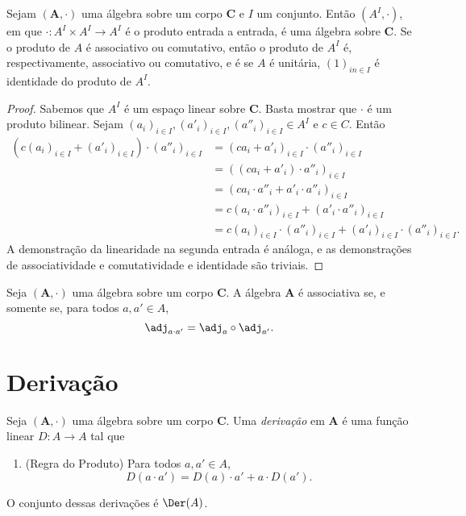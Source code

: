\begin{prop}
Sejam $(\bm A,\cdot)$ uma álgebra sobre um corpo $\bm C$ e $I$ um conjunto. Então $(A^I,\cdot)$, em que $\cdot\colon A^I \times A^I \to A^I$ é o produto entrada a entrada, é uma álgebra sobre $\bm C$. Se o produto de $A$ é associativo ou comutativo, então o produto de $A^I$ é, respectivamente, associativo ou comutativo, e é se $A$ é unitária, $(1)_{in \in I}$ é identidade do produto de $A^I$.
\end{prop}
\begin{proof}
Sabemos que $A^I$ é um espaço linear sobre $\bm C$. Basta mostrar que $\cdot$ é um produto bilinear. Sejam $(a_i)_{i \in I},(a'_i)_{i \in I},(a''_i)_{i \in I} \in A^I$ e $c \in C$. Então
	\begin{align*}
	(c(a_i)_{i \in I} + (a'_i)_{i \in I}) \cdot (a''_i)_{i \in I} &= (ca_i + a'_i)_{i \in I} \cdot (a''_i)_{i \in I} \\
	&= ((ca_i + a'_i) \cdot a''_i)_{i \in I} \\
	&= (ca_i \cdot a''_i + a'_i \cdot a''_i)_{i \in I} \\
	&= c(a_i \cdot a''_i)_{i \in I} + (a'_i \cdot a''_i)_{i \in I} \\
	&= c(a_i)_{i \in I} \cdot (a''_i)_{i \in I} + (a'_i)_{i \in I} \cdot (a''_i)_{i \in I}.
	\end{align*}
A demonstração da linearidade na segunda entrada é análoga, e as demonstrações de associatividade e comutatividade e identidade são triviais.
\end{proof}

\begin{prop}
Seja $(\bm A,\cdot)$ uma álgebra sobre um corpo $\bm C$. A álgebra $\bm A$ é associativa se, e somente se, para todos $a,a' \in A$,
	\begin{equation*}
	\adj_{a \cdot a'} = \adj_a \circ \adj_{a'}.
	\end{equation*}
\end{prop}

\section{Derivação}

\begin{defi}
Seja $(\bm A,\cdot)$ uma álgebra sobre um corpo $\bm C$. Uma \emph{derivação} em $\bm A$ é uma função linear $D\colon A \to A$ tal que
	\begin{enumerate}
	\item (Regra do Produto) Para todos $a,a' \in A$,
		\begin{equation*}
		D(a \cdot a') = D(a) \cdot a' + a \cdot D(a').
		\end{equation*}
	\end{enumerate}
O conjunto dessas derivações é $\Der(A)$.
\end{defi}

